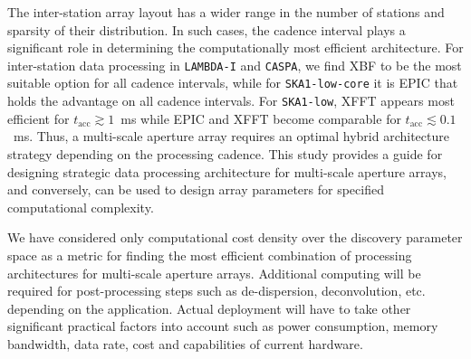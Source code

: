 \documentclass[
  journal=pasa,
  manuscript=article-type,
  year=2020,
  volume=37,
]{cup-journal}
\begin{document}
The inter-station array layout has a wider range in the number of stations and sparsity of their distribution. In such cases, the cadence interval plays a significant role in determining the computationally most efficient architecture. For inter-station data processing in \texttt{LAMBDA-I} and \texttt{CASPA}, we find XBF to be the most suitable option for all cadence intervals, while for \texttt{SKA1-low-core} it is EPIC that holds the advantage on all cadence intervals. For \texttt{SKA1-low}, XFFT appears most efficient for $t_\textrm{acc}\gtrsim 1$~ms while EPIC and XFFT become comparable for $t_\textrm{acc}\lesssim 0.1$~ms. Thus, a multi-scale aperture array requires an optimal hybrid architecture strategy depending on the processing cadence. This study provides a guide for designing strategic data processing architecture for multi-scale aperture arrays, and conversely, can be used to design array parameters for specified computational complexity. 

We have considered only computational cost density over the discovery parameter space as a metric for finding the most efficient combination of processing architectures for multi-scale aperture arrays. Additional computing will be required for post-processing steps such as de-dispersion, deconvolution, etc. depending on the application. Actual deployment will have to take other significant practical factors into account such as power consumption, memory bandwidth, data rate, cost and capabilities of current hardware.




\end{document}
